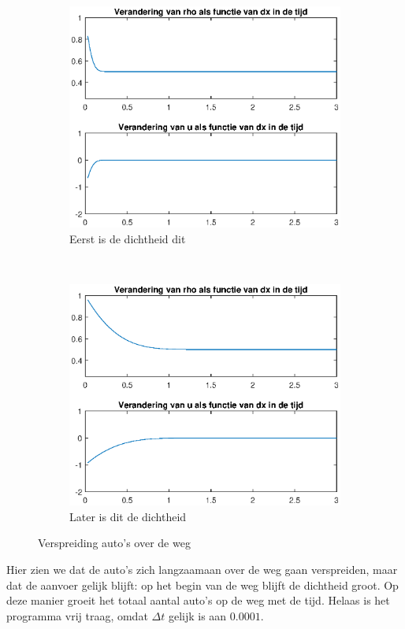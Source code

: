 \documentclass{article}
\newcommand{\Dt}{\Delta t}
\begin{document}
\begin{figure}[H]
  \centering
  \begin{subfigure}{0.7\textwidth}
  \includegraphics[width=\textwidth]{ss31.eps}
  \caption{Eerst is de dichtheid dit}
  \end{subfigure}
  ~
  \begin{subfigure}{0.7\textwidth}
  \includegraphics[width=\textwidth]{ss33.eps}
  \caption{Later is dit de dichtheid}
  \end{subfigure}
  \caption{Verspreiding auto's over de weg}
  \label{fig:scrshots}
\end{figure}
\vspace{-10pt}
Hier zien we dat de auto's zich langzaamaan over de weg gaan verspreiden, maar dat de aanvoer gelijk blijft: op het begin van de weg blijft de dichtheid groot.
Op deze manier groeit het totaal aantal auto's op de weg met de tijd.
Helaas is het programma vrij traag, omdat $\Dt$ gelijk is aan $0.0001$.
\end{document}
